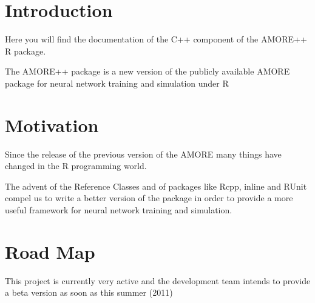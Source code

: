 \hypertarget{main_intro_sec}{}\section{Introduction}\label{main_intro_sec}
Here you will find the documentation of the C++ component of the AMORE++ R package.

The AMORE++ package is a new version of the publicly available AMORE package for neural network training and simulation under R\hypertarget{main_motiv_sec}{}\section{Motivation}\label{main_motiv_sec}
Since the release of the previous version of the AMORE many things have changed in the R programming world.

The advent of the Reference Classes and of packages like Rcpp, inline and RUnit compel us to write a better version of the package in order to provide a more useful framework for neural network training and simulation.\hypertarget{main_RoadMap}{}\section{Road Map}\label{main_RoadMap}
This project is currently very active and the development team intends to provide a beta version as soon as this summer (2011) 
